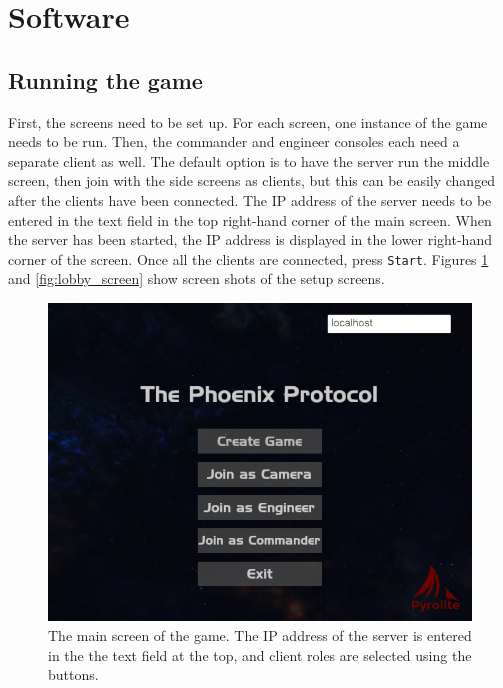 \documentclass[a4paper,11pt]{article}
\begin{document}
\section{Software}

\subsection{Running the game}

First, the screens need to be set up. For each screen, one instance of the game needs to be run. Then, the commander and engineer consoles each need a separate client as well. The default option is to have the server run the middle screen, then join with the side screens as clients, but this can be easily changed after the clients have been connected. The IP address of the server needs to be entered in the text field in the top right-hand corner of the main screen. When the server has been started, the IP address is displayed in the lower right-hand corner of the screen. Once all the clients are connected, press \texttt{Start}. Figures \ref{fig:first_screen} and \ref{fig:lobby_screen} show screen shots of the setup screens.

\begin{figure}[ht]
	\centering
    \includegraphics[width=.7\textwidth]{game_first_screen}
    \caption{The main screen of the game. The IP address of the server is entered in the the text field at the top, and client roles are selected using the buttons.}
    \label{fig:first_screen}
\end{figure}
\end{document}
